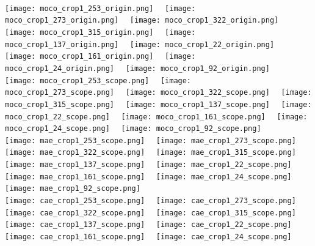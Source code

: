 \documentclass[twocolumn]{svjour3}          \smartqed  \usepackage{graphicx}
\begin{document}
\begin{figure*}[t]
\\
\vspace{1mm}
\texttt{[image: moco\_crop1\_253\_origin.png]}~~
\texttt{[image: moco\_crop1\_273\_origin.png]}~~
\texttt{[image: moco\_crop1\_322\_origin.png]}~~
\texttt{[image: moco\_crop1\_315\_origin.png]}~~
\texttt{[image: moco\_crop1\_137\_origin.png]}~~
\texttt{[image: moco\_crop1\_22\_origin.png]}~~
\texttt{[image: moco\_crop1\_161\_origin.png]}~~
\texttt{[image: moco\_crop1\_24\_origin.png]}~~
\texttt{[image: moco\_crop1\_92\_origin.png]}~~
\\
\vspace{1mm}
\texttt{[image: moco\_crop1\_253\_scope.png]}~~
\texttt{[image: moco\_crop1\_273\_scope.png]}~~
\texttt{[image: moco\_crop1\_322\_scope.png]}~~
\texttt{[image: moco\_crop1\_315\_scope.png]}~~
\texttt{[image: moco\_crop1\_137\_scope.png]}~~
\texttt{[image: moco\_crop1\_22\_scope.png]}~~
\texttt{[image: moco\_crop1\_161\_scope.png]}~~
\texttt{[image: moco\_crop1\_24\_scope.png]}~~
\texttt{[image: moco\_crop1\_92\_scope.png]}~~
\\
\vspace{1mm}
\texttt{[image: mae\_crop1\_253\_scope.png]}~~
\texttt{[image: mae\_crop1\_273\_scope.png]}~~
\texttt{[image: mae\_crop1\_322\_scope.png]}~~
\texttt{[image: mae\_crop1\_315\_scope.png]}~~
\texttt{[image: mae\_crop1\_137\_scope.png]}~~
\texttt{[image: mae\_crop1\_22\_scope.png]}~~
\texttt{[image: mae\_crop1\_161\_scope.png]}~~
\texttt{[image: mae\_crop1\_24\_scope.png]}~~
\texttt{[image: mae\_crop1\_92\_scope.png]}~~
\\
\vspace{1mm}
\texttt{[image: cae\_crop1\_253\_scope.png]}~~
\texttt{[image: cae\_crop1\_273\_scope.png]}~~
\texttt{[image: cae\_crop1\_322\_scope.png]}~~
\texttt{[image: cae\_crop1\_315\_scope.png]}~~
\texttt{[image: cae\_crop1\_137\_scope.png]}~~
\texttt{[image: cae\_crop1\_22\_scope.png]}~~
\texttt{[image: cae\_crop1\_161\_scope.png]}~~
\texttt{[image: cae\_crop1\_24\_scope.png]}~~

\end{figure*}
\end{document}
